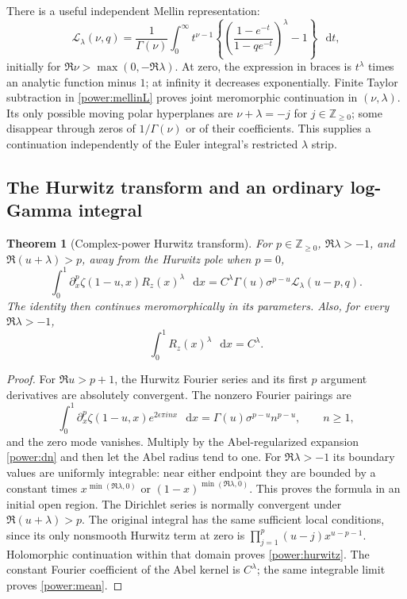 \documentclass[11pt,a4paper]{article}
\numberwithin{equation}{section}
\newtheorem{theorem}{Theorem}[section]
\theoremstyle{definition}
\theoremstyle{remark}
\newcommand{\dd}{\mathop{}\!\mathrm{d}}
\begin{document}
There is a useful independent Mellin representation:
\begin{equation}\label{power:mellinL}
 \mathcal L_\lambda(\nu,q)=\frac1{\Gamma(\nu)}
 \int_0^\infty t^{\nu-1}
 \left\{\left(\frac{1-e^{-t}}{1-qe^{-t}}\right)^\lambda-1\right\}
 \,\dd t,
\end{equation}
initially for $\Re\nu>\max(0,-\Re\lambda)$.
At zero, the expression in braces is $t^\lambda$ times an analytic
function minus $1$; at infinity it decreases exponentially.
Finite Taylor subtraction in \eqref{power:mellinL} proves joint
meromorphic continuation in $(\nu,\lambda)$.  Its only possible
moving polar hyperplanes are
$\nu+\lambda=-j$ for $j\in\mathbb Z_{\ge0}$; some disappear
through zeros of $1/\Gamma(\nu)$ or of their coefficients.
This supplies a continuation independently of the Euler integral's
restricted $\lambda$ strip.

\subsection{The Hurwitz transform and an ordinary log-Gamma integral}

\begin{theorem}[Complex-power Hurwitz transform]\label{power:hurwitzthm}
For $p\in\mathbb Z_{\ge0}$, $\Re\lambda>-1$, and
$\Re(u+\lambda)>p$, away from the Hurwitz pole when $p=0$,
\begin{equation}\label{power:hurwitz}
 \boxed{\displaystyle
 \int_0^1\partial_x^p\zeta(1-u,x)R_z(x)^\lambda\,\dd x
 =C^\lambda\Gamma(u)\sigma^{p-u}
                    \mathcal L_\lambda(u-p,q).}
\end{equation}
The identity then continues meromorphically in its parameters.  Also,
for every $\Re\lambda>-1$,
\begin{equation}\label{power:mean}
 \int_0^1R_z(x)^\lambda\,\dd x=C^\lambda.
\end{equation}
\end{theorem}

\begin{proof}
For $\Re u>p+1$, the Hurwitz Fourier series and its first $p$
argument derivatives are absolutely convergent.  The nonzero Fourier
pairings are
\[
 \int_0^1\partial_x^p\zeta(1-u,x)e^{2\epsilon\pi inx}\,\dd x
     =\Gamma(u)\sigma^{p-u}n^{p-u},\qquad n\ge1,
\]
and the zero mode vanishes.  Multiply by the Abel-regularized expansion
\eqref{power:dn} and then let the Abel radius tend to one.
For $\Re\lambda>-1$ its boundary values are uniformly integrable:
near either endpoint they are bounded by a constant times
$x^{\min(\Re\lambda,0)}$ or $(1-x)^{\min(\Re\lambda,0)}$.
This proves the formula in an initial open region.  The Dirichlet
series is normally convergent under $\Re(u+\lambda)>p$.
The original integral has the same sufficient local conditions, since
its only nonsmooth Hurwitz term at zero is
$\prod_{j=1}^p(u-j)x^{u-p-1}$.  Holomorphic continuation within
that domain proves \eqref{power:hurwitz}.  The constant Fourier
coefficient of the Abel kernel is $C^\lambda$; the same integrable
limit proves \eqref{power:mean}.
\end{proof}
\end{document}
